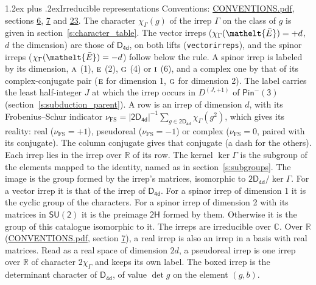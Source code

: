 \documentclass[10pt,a4paper]{article}
\makeatletter
\renewcommand\section{\@startsection{section}{1}{\z@}{-3ex plus -1ex minus -.2ex}%
  {1.2ex plus .2ex}{\normalfont\large\sffamily\bfseries\color{parttitle}}}
\numberwithin{equation}{section}
\newcommand{\eltfont}[1]{{\let\sigma\eltsigma\mathelt{#1}}}
\newcommand{\grp}[1]{\mathsf{#1}}
\newcommand{\irr}[1]{\text{\normalfont\scshape #1}}
\newcommand{\elt}[1]{\eltfont{#1}}
\newcommand{\irrJp}[2]{D^{(#1,#2)}}
\newcommand{\irchar}[1]{\chi_{#1}}
\newcommand{\fsind}{\nu_{\mathrm{FS}}}
\newcommand{\barred}[1]{\bar{#1}}
\makeatother
\begin{document}
\section{Irreducible representations}\label{s:irreps}
Conventions: \href{../../CONVENTIONS.pdf}{CONVENTIONS.pdf}, sections \href{../../../rotation/CONVENTIONS.pdf\#conv.6}{6}, \href{../../../rotation/CONVENTIONS.pdf\#conv.7}{7} and \href{../../CONVENTIONS.pdf\#conv.23}{23}.
\leavevmode\label{n:function.character}\label{n:irrep.Gamma}The character $\irchar{\Gamma}(g)$ of the irrep $\Gamma$ on the class of $g$ is given in section~\ref{s:character_table}. \label{n:index.dimension}The vector irreps ($\irchar{\Gamma}(\elt{\barred{E}}) = +d$, $d$ the dimension) are those of \href{../../../rotation/data/pdf/D4d.pdf}{$\grp{D_{4d}}$}, on both lifts (\texttt{vectorirreps}), and the spinor irreps ($\irchar{\Gamma}(\elt{\barred{E}}) = -d$) follow below the rule. A spinor irrep is labeled by its dimension, $\irr{a}$ (1), $\irr{e}$ (2), $\irr{g}$ (4) or $\irr{i}$ (6), and a complex one by that of its complex-conjugate pair ($\irr{e}$ for dimension 1, $\irr{g}$ for dimension 2). The label carries the least half-integer $J$ at which the irrep occurs in $\irrJp{J}{+1}$ of $\grp{Pin^{-}(3)}$ (section~\ref{s:subduction_parent}).
\leavevmode\label{n:index.frobenius}\label{n:head.irrep}\label{n:head.reality}A row is an irrep of dimension $d$, with its Frobenius--Schur indicator $\fsind = |\grp{2D_{4d}}|^{-1}\allowbreak\sum_{g\in\grp{2D_{4d}}}\irchar{\Gamma}(g^2)$, which gives its reality: real ($\fsind = +1$), pseudoreal ($\fsind = -1$) or complex ($\fsind = 0$, paired with its conjugate). \label{n:head.conjugate}The column conjugate gives that conjugate (a dash for the others). \label{n:head.over.real}Each irrep lies in the irrep over $\mathbb{R}$ of its row. \label{n:head.kernel}The kernel $\ker\Gamma$ is the subgroup of the elements mapped to the identity, named as in section~\ref{s:subgroups}. \label{n:head.image}The image is the group formed by the irrep's matrices, isomorphic to $\grp{2D_{4d}}/\ker\Gamma$. For a vector irrep it is that of the irrep of \href{../../../rotation/data/pdf/D4d.pdf}{$\grp{D_{4d}}$}. For a spinor irrep of dimension 1 it is the cyclic group of the characters. For a spinor irrep of dimension 2 with its matrices in $\grp{SU(2)}$ it is the preimage $\grp{2H}$ formed by them. Otherwise it is the group of this catalogue isomorphic to it. The irreps are irreducible over $\mathbb{C}$. Over $\mathbb{R}$ (\href{../../CONVENTIONS.pdf}{CONVENTIONS.pdf}, section \href{../../../rotation/CONVENTIONS.pdf\#conv.7}{7}), a real irrep is also an irrep in a basis with real matrices. Read as a real space of dimension $2d$, a pseudoreal irrep is one irrep over $\mathbb{R}$ of character $2\irchar{\Gamma}$ and keeps its own label. \label{n:mark.determinant}The boxed irrep is the determinant character of \href{../../../rotation/data/pdf/D4d.pdf}{$\grp{D_{4d}}$}, of value $\det g$ on the element $(g, b)$.
\end{document}
